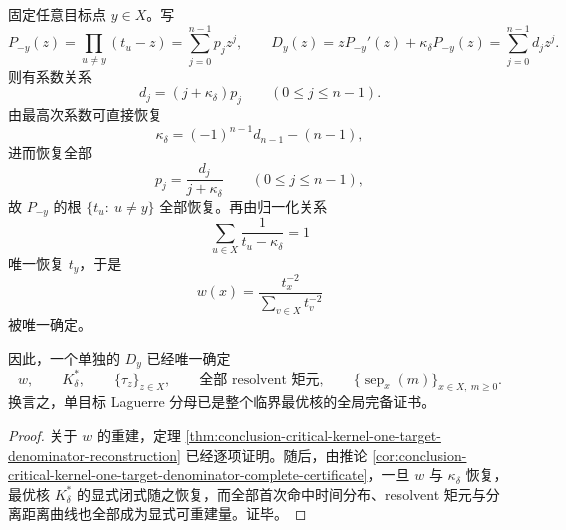 \begin{theorem}\label{thm:conclusion-endpoint-one-target-laguerre-global-certificate}
固定任意目标点 \(y\in X\)。写
\[
P_{-y}(z)=\prod_{u\ne y}(t_u-z)=\sum_{j=0}^{n-1}p_j z^j,
\qquad
D_y(z)=zP_{-y}'(z)+\kappa_\delta P_{-y}(z)=\sum_{j=0}^{n-1}d_j z^j.
\]
则有系数关系
\[
d_j=(j+\kappa_\delta)p_j\qquad(0\le j\le n-1).
\]
由最高次系数可直接恢复
\[
\kappa_\delta=(-1)^{n-1}d_{n-1}-(n-1),
\]
进而恢复全部
\[
p_j=\frac{d_j}{j+\kappa_\delta}\qquad(0\le j\le n-1),
\]
故 \(P_{-y}\) 的根 \(\{t_u:\ u\ne y\}\) 全部恢复。再由归一化关系
\[
\sum_{u\in X}\frac{1}{t_u-\kappa_\delta}=1
\]
唯一恢复 \(t_y\)，于是
\[
w(x)=\frac{t_x^{-2}}{\sum_{v\in X}t_v^{-2}}
\]
被唯一确定。

因此，一个单独的 \(D_y\) 已经唯一确定
\[
w,
\qquad
K_\delta^\ast,
\qquad
\{\tau_z\}_{z\in X},
\qquad
\text{全部 resolvent 矩元},
\qquad
\{\operatorname{sep}_x(m)\}_{x\in X,\ m\ge 0}.
\]
换言之，单目标 Laguerre 分母已是整个临界最优核的全局完备证书。
\end{theorem}
\begin{proof}
关于 \(w\) 的重建，定理 \ref{thm:conclusion-critical-kernel-one-target-denominator-reconstruction} 已经逐项证明。随后，由推论 \ref{cor:conclusion-critical-kernel-one-target-denominator-complete-certificate}，一旦 \(w\) 与 \(\kappa_\delta\) 恢复，最优核 \(K_\delta^\ast\) 的显式闭式随之恢复，而全部首次命中时间分布、resolvent 矩元与分离距离曲线也全部成为显式可重建量。证毕。
\end{proof}

